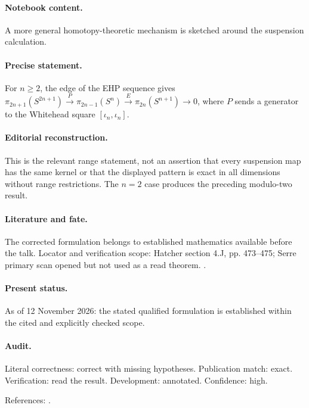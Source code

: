 \paragraph{Notebook content.} A more general homotopy-theoretic mechanism is sketched around the suspension calculation.

\paragraph{Precise statement.} For \(n\ge2\), the edge of the EHP sequence gives \(\pi_{2n+1}(S^{2n+1})\xrightarrow{P}\pi_{2n-1}(S^n)\xrightarrow{E}\pi_{2n}(S^{n+1})\to0\), where \(P\) sends a generator to the Whitehead square \([\iota_n,\iota_n]\).

\paragraph{Editorial reconstruction.} This is the relevant range statement, not an assertion that every suspension map has the same kernel or that the displayed pattern is exact in all dimensions without range restrictions. The \(n=2\) case produces the preceding modulo-two result.

\paragraph{Literature and fate.} The corrected formulation belongs to established mathematics available before the talk. Locator and verification scope: Hatcher section 4.J, pp. 473--475; Serre primary scan opened but not used as a read theorem. \cite{hatcher2002algebraic,serre1953classes}.

\paragraph{Present status.} As of 12 November 2026: the stated qualified formulation is established within the cited and explicitly checked scope.

\paragraph{Audit.} Literal correctness: correct with missing hypotheses. Publication match: exact. Verification: read the result. Development: annotated. Confidence: high.

\noindent References: \citep{hatcher2002algebraic,serre1953classes}.\par

